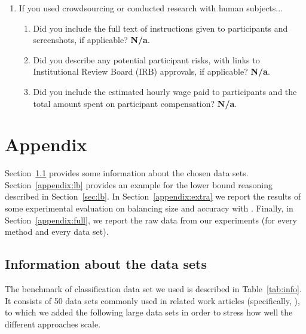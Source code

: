 \documentclass{article}
\begin{document}
\begin{enumerate}
\item If you used crowdsourcing or conducted research with human subjects...
\begin{enumerate}
  \item Did you include the full text of instructions given to participants and screenshots, if applicable?
		\textbf{N/a}.
  \item Did you describe any potential participant risks, with links to Institutional Review Board (IRB) approvals, if applicable?
		\textbf{N/a}.
  \item Did you include the estimated hourly wage paid to participants and the total amount spent on participant compensation?
		\textbf{N/a}.
\end{enumerate}

\end{enumerate}


\appendix

\section{Appendix}


Section~\ref{appendix:info} provides some information about the chosen data sets. Section~\ref{appendix:lb} provides an example for the lower bound reasoning described in Section~\ref{sec:lb}. In Section~\ref{appendix:extra} we report the results of some experimental evaluation on balancing size and accuracy with \blossom. Finally, in Section~\ref{appendix:full}, we report the raw data from our experiments (for every method and every data set).


\subsection{Information about the data sets}
\label{appendix:info}


The benchmark of classification data set we used is described in Table~\ref{tab:info}. It consists of 50 data sets 
commonly used in related work articles (specifically, \cite{narodytska2018learning,dl85,verwer2019learning}), to which we added the following large data sets in order to stress how well the different approaches scale.
\end{document}
